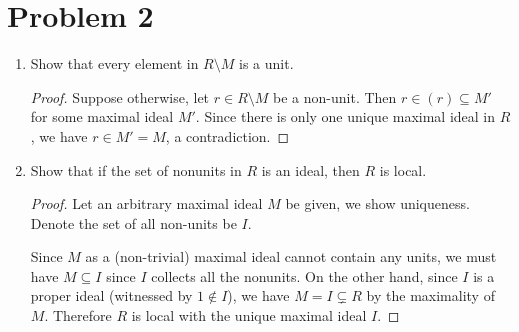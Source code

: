 \documentclass{article}
\theoremstyle{plain}
\begin{document}
\section*{Problem 2}
\begin{enumerate}
  \item Show that every element in $R\setminus M$ is a unit.
\begin{proof}
        Suppose otherwise, let $r\in R\setminus M$ be a non-unit. Then $r\in(r)\subseteq M'$ for some
        maximal ideal $M'$. Since there is only one unique maximal ideal in $R$,
        we have $r\in M'=M$, a contradiction.
  \end{proof}
    \item Show that if the set of nonunits in $R$ is an ideal, then $R$ is local.
        \begin{proof}
          Let an arbitrary maximal ideal $M$ be given, we show uniqueness.
          Denote the set of all non-units be $I$.

          Since $M$ as a (non-trivial) maximal ideal cannot contain any units,
          we must have $M\subseteq I$ since $I$ collects all the nonunits. On the other
          hand, since $I$ is a proper ideal (witnessed by $1\notin I$), we have
          $M=I\subsetneq R$ by the maximality of $M$. Therefore $R$ is local with the
          unique maximal ideal $I$.
        \end{proof}
\end{enumerate}
\end{document}

